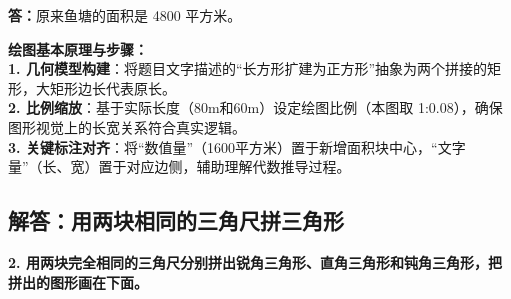 \vspace{0.2cm}
\noindent\textbf{答：}原来鱼塘的面积是 4800 平方米。

\vspace{0.6cm}

{\small\color{blue!70!black}
\textbf{绘图基本原理与步骤：}\\
\textbf{1. 几何模型构建}：将题目文字描述的“长方形扩建为正方形”抽象为两个拼接的矩形，大矩形边长代表原长。\\
\textbf{2. 比例缩放}：基于实际长度（80m和60m）设定绘图比例（本图取 1:0.08），确保图形视觉上的长宽关系符合真实逻辑。\\
\textbf{3. 关键标注对齐}：将“数值量”（1600平方米）置于新增面积块中心，“文字量”（长、宽）置于对应边侧，辅助理解代数推导过程。
}


\newpage

\newpage

\subsection{解答：用两块相同的三角尺拼三角形}

\vspace{0.4cm}

\noindent\textbf{2. 用两块完全相同的三角尺分别拼出锐角三角形、直角三角形和钝角三角形，把拼出的图形画在下面。}

\vspace{0.8cm}

